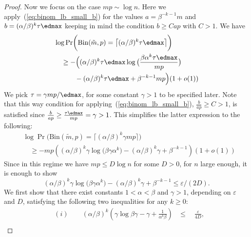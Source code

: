 \begin{proof}
    \noindent
    Now we focus on the case \(mp \sim \log n\). Here we apply~(\ref{eq:binom_lb_small_b}) for the values \(a = {\beta}^{-k-1}m\) and \(b = (\alpha / \beta)^k \tau \edmax\) keeping in mind the condition \(b \geq Cap\) with \(C > 1\). 
    We have
    \begin{equation*}
    \begin{aligned}
         &\log \Pr\biggl(\mathrm{Bin}(\tilde m, p) = \bigl\lceil (\alpha / \beta)^k \tau \edmax\bigr\rceil \biggr) \\
         &\quad \geq - \Big((\alpha / \beta)^k \tau \edmax \log \big(\frac{\beta \alpha^k \tau \edmax}{ mp}\big) \\
         &\quad \qquad - (\alpha / \beta)^k \tau \edmax + \beta^{-k-1}mp\Big)(1 + o(1)) 
    \end{aligned}
    \end{equation*}
    We pick \(\tau = \gamma mp / \edmax\), for some constant \(\gamma > 1\) to be specified later. Note that this way condition for applying~(\ref{eq:binom_lb_small_b}), \(\frac{b}{ap} \geq C > 1\), is satisfied since \(\frac{b}{ap} \geq \frac{\tau \edmax}{mp} = \gamma > 1\). This simplifies the latter expression to the following:
       \begin{equation*}
    \begin{aligned}
         &\log \Pr\biggl(\mathrm{Bin}(\tilde m, p) = \bigl\lceil (\alpha / \beta)^k \gamma mp\bigr\rceil \biggr) \\
         &\quad \geq - mp\left((\alpha / \beta)^k \gamma \log \bigl(\beta \gamma \alpha^k\bigr) - (\alpha / \beta)^k \gamma + \beta^{-k-1}\right)(1 + o(1)) 
    \end{aligned}
    \end{equation*}
Since in this regime we have \(mp \leq D \log n\) for some \(D > 0\), for \(n\) large enough, it is enough to show 
\begin{equation*}
   (\alpha / \beta)^k \gamma \log \bigl(\beta \gamma \alpha^k\bigr) - (\alpha / \beta)^k \gamma + \beta^{-k-1} \leq \varepsilon / (2D).
\end{equation*}
We first show that there exist constants \(1 < \alpha < \beta\) and \(\gamma > 1\), depending on \(\varepsilon\) and \(D\), satisfying the following two inequalities for any \(k \geq 0\):
\begin{equation*}
    \begin{aligned}
        &(i) \qquad (\alpha/\beta)^k \left(\gamma \log \beta \gamma - \gamma + \frac{1}{\alpha^k \beta}\right) &\leq \quad \frac{\varepsilon}{4D}, \\

\end{aligned}
\end{equation*}
\end{proof}
